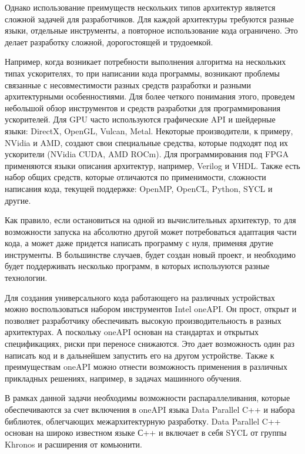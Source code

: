 \documentclass[10pt,a4paper]{book}
\begin{document}
Однако использование преимуществ нескольких типов архитектур является сложной задачей для разработчиков. Для каждой архитектуры требуются разные языки, отдельные инструменты, а повторное использование кода ограничено. Это делает разработку сложной, дорогостоящей и трудоемкой.

Например, когда возникает потребности выполнения алгоритма на нескольких типах ускорителях, то при написании кода программы, возникают проблемы связанные с несовместимости разных средств разработки и разными архитектурными особенностиями. Для более четкого понимания этого, проведем небольшой обзор инструментов и средств разработки для программирования ускорителей. Для GPU часто используются графические API и шейдерные языки: DirectX, OpenGL, Vulcan, Metal. Некоторые производители, к примеру, NVidia и AMD, создают свои специальные средства, которые подходят под их ускорители (NVidia CUDA, AMD ROCm). Для программирования под FPGA применяются языки описания архитектур, например, Verilog и VHDL. Также есть набор общих средств, которые отличаются по применимости, сложности написания кода, текущей поддержке: OpenMP, OpenCL, Python, SYCL и другие. 

Как правило, если остановиться на одной из вычислительных архитектур, то для возможности запуска на абсолютно другой может потребоваться адаптация части кода, а может даже придется написать программу с нуля, применяя другие инструменты. В большинстве случаев, будет создан новый проект, и необходимо будет поддерживать несколько программ, в которых используются разные технологии.

Для создания универсального кода работающего на различных устройствах можно воспользоваться набором инструментов Intel oneAPI. Он прост, открыт и позволяет разработчику обеспечивать высокую производительность в разных архитектурах. А поскольку oneAPI основан на стандартах и открытых спецификациях, риски при переносе снижаются. Это дает возможность один раз написать код и в дальнейшем запустить его на другом устройстве. Также к преимуществам oneAPI можно отнести возможность применения в различных прикладных решениях, например, в задачах машинного обучения.

В рамках данной задачи необходимы возможности распараллеливания, которые обеспечиваются за счет включения в oneAPI языка Data Parallel C++ и набора библиотек, облегчающих межархитектурную разработку. Data Parallel C++ основан на широко известном языке С++ и включает в себя SYCL от группы Khronos и расширения от комьюнити.
\end{document}
